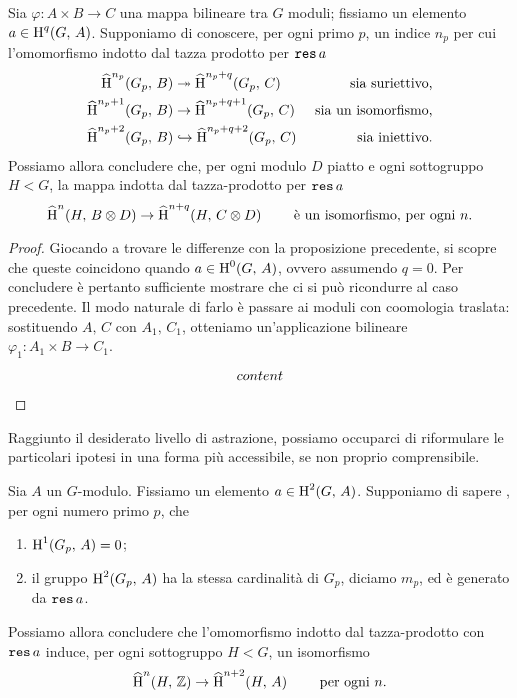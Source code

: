 \begin{proposition}
	Sia $ \varphi \colon A \times B \to C $ una mappa bilineare tra $ G $ moduli; fissiamo un elemento $ a \in \operatorname{H}^q(G, \, A) $. Supponiamo di conoscere, per ogni primo $ p $, un indice $ n_p $ per cui l'omomorfismo indotto dal tazza prodotto per $ \operatorname{\mathtt{res}} a $
	\begin{align*}
	\operatorname{\widehat{H}}^{n_p}(G_p,\, B) &\twoheadrightarrow \operatorname{\widehat{H}}^{n_p+q}(G_p,\, C) & \text{ sia suriettivo,} \\
	\operatorname{\widehat{H}}^{n_p+1}(G_p,\, B) &\to \operatorname{\widehat{H}}^{n_p+q+1}(G_p,\, C) & \text{ sia un isomorfismo,} \\
	\operatorname{\widehat{H}}^{n_p+2}(G_p,\, B) &\hookrightarrow \operatorname{\widehat{H}}^{n_p+q+2}(G_p,\, C) & \text{ sia iniettivo.}
	\end{align*}
	Possiamo allora concludere che, per ogni modulo $ D $ piatto e ogni sottogruppo $ H < G $, la mappa indotta dal tazza-prodotto per $ \operatorname{\mathtt{res}} a $
	\[ \operatorname{\widehat{H}}^n(H, \, B \otimes D) \to \operatorname{\widehat{H}}^{n+q}(H, \,  C\otimes D) \qquad\text{ è un isomorfismo, per ogni } n. \]
\end{proposition}

\begin{proof}
	Giocando a trovare le differenze con la proposizione precedente, si scopre che queste coincidono quando $ a \in \operatorname{H}^0(G, \, A) $, ovvero assumendo $ q = 0. $ Per concludere è pertanto sufficiente mostrare che ci si può ricondurre al caso precedente. Il modo naturale di farlo è passare ai moduli con coomologia traslata: sostituendo $ A, \, C $ con $ A_1 ,\,  C_1 $, otteniamo un'applicazione bilineare $ \varphi_1\colon A_1 \times B \to C_1 $.
	\[ \begin{tikzcd}
	content
	\end{tikzcd} \]
	
\end{proof}

Raggiunto il desiderato livello di astrazione, possiamo occuparci di riformulare le particolari ipotesi in una forma più accessibile, se non proprio comprensibile.

\begin{theorem}
	Sia $ A $ un $ G $-modulo. Fissiamo un elemento $ a \in \operatorname{H}^2(G, \, A) $. Supponiamo di sapere , per ogni numero primo $ p $, che
	\begin{enumerate}[label = \roman*.]
		\item $ \operatorname{H}^1(G_p, \, A) = 0 $;
		\item il gruppo $ \operatorname{H}^2(G_p, \, A) $ ha la stessa cardinalità di $ G_p $, diciamo $ m_p $, ed è generato da $ \operatorname{\mathtt{res}} a $.
	\end{enumerate}
	Possiamo allora concludere che l'omomorfismo indotto dal tazza-prodotto con $ \operatorname{\mathtt{res}} a $ induce, per ogni sottogruppo $ H < G $, un isomorfismo
	\[ \operatorname{\widehat{H}}^n(H, \, \mathbb{Z}) \to \operatorname{\widehat{H}}^{n+2}(H, \,  A) \qquad \text{ per ogni } n.\]
\end{theorem}

